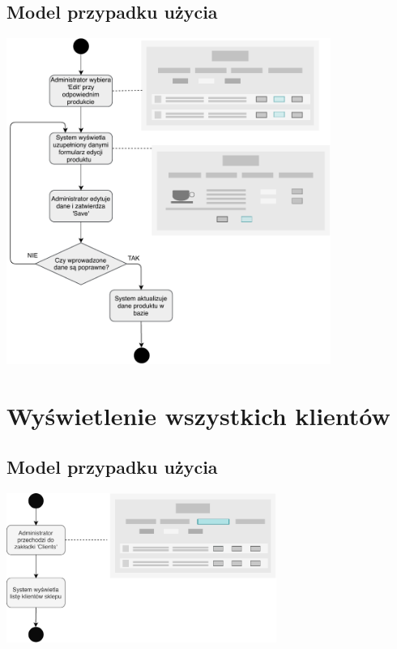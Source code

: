 \documentclass[12pt]{report}
\begin{document}
		\subsection{Model przypadku użycia}
			\begin{center}
				\includegraphics[width=300pt]{edytuj_admin.pdf}
			\end{center}
		
		
	\section{Wyświetlenie wszystkich klientów}
		\subsection{Model przypadku użycia}
			\begin{center}
				\includegraphics[width=250pt]{klienci.pdf}
			\end{center}
			
		
\end{document}
